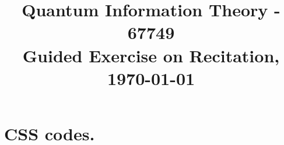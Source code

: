 \documentclass[12pt,a4paper]{article}
\title{ \begin{framed} Quantum Information Theory - 67749 \\ 
Guided Exercise on Recitation, \today \end{framed}  }
\date{\vspace{-5ex}}
\begin{document}
 
\maketitle{ }    


\newcommand{\CCZ}{\textbf{CCZ}}
\newcommand{\CCX}{\textbf{CCX}}


\setcounter{enumcirc}{1} 


\newcommand{\advanceday}[1][21]{%
\begingroup
\AdvanceDate[#1]%
\today%
\endgroup
}%


\newcommand{\subqCircEx}[2]{\begin{subfigure}[t]{0.5\textwidth}
        \stepcounter{enumcirc} \caption*{ (\alph{enumcirc}) #1} \centering 
        #2
    \end{subfigure}
}

\newcommand{\qCircEx}[4]{\begin{figure*}[h!]
    \centering
    \subqCircEx{#1}{#2}
    ~ 
    \subqCircEx{#3}{#4}
\end{figure*}
}

\newcommand{\qCircExfullline}[2]{\begin{figure*}[h!]
    \stepcounter{enumcirc} \caption*{ (\alph{enumcirc}) #1}
        \centering 
        #2
\end{figure*}
}

\newcommand{\Tr}{\mathbf{Tr}}

\section{CSS codes.}
\end{document}
